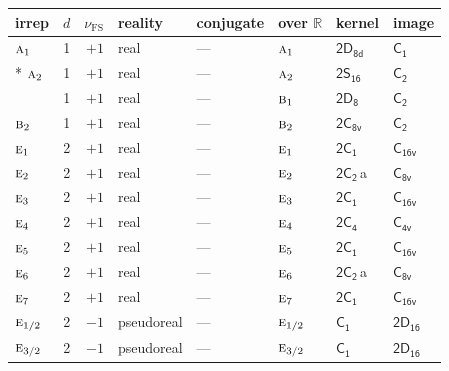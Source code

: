 \documentclass[10pt,a4paper]{article}
\makeatletter
\def\grouprule#1#2{\noalign{\marks\LTgroupmarks{\the\belowrulesep}\nobreak\vskip#1%
  \vskip\aboverulesep}\multispan\LT@cols\unskip{\leaders\hrule\@height#2\hfill\kern\z@}\cr
  \noalign{\penalty\LTrulebreak\vskip\belowrulesep\global\@lastruleclass\z@}}
\numberwithin{equation}{section}
\newcommand{\grp}[1]{\mathsf{#1}}
\newcommand{\irr}[1]{\text{\normalfont\scshape #1}}
\newcommand{\detbox}[1]{{\setlength{\fboxsep}{1pt}\fbox{#1}}}
\newcommand{\clsletter}[1]{\,{\scriptsize\color{black!55}#1}}
\newcommand{\fsind}{\nu_{\mathrm{FS}}}
\makeatother
\begin{document}
\setlength{\emergencystretch}{2em}\par\setlength{\emergencystretch}{0pt}
{\small\renewcommand{\arraystretch}{1.25}\setlength{\tabcolsep}{4pt}\begin{longtable}{@{}lrrlllll@{}}\toprule
irrep & $d$ & $\fsind$ & reality & conjugate & over $\mathbb{R}$ & kernel & image\\\midrule\endhead
\bottomrule\endfoot\endlastfoot
$\irr{a}_{1}$ & 1 & $+1$ & real & --- & $\irr{a}_{1}$ & \href{2D8d.pdf}{$\grp{2D_{8d}}$} & \href{../../../rotation/data/pdf/C1.pdf}{$\grp{C_{1}}$}\\*
$\irr{a}_{2}$ & 1 & $+1$ & real & --- & $\irr{a}_{2}$ & \href{2S16.pdf}{$\grp{2S_{16}}$} & \href{../../../rotation/data/pdf/C2.pdf}{$\grp{C_{2}}$}\\
\detbox{$\irr{b}_{1}$} & 1 & $+1$ & real & --- & $\irr{b}_{1}$ & \href{2D8.pdf}{$\grp{2D_{8}}$} & \href{../../../rotation/data/pdf/C2.pdf}{$\grp{C_{2}}$}\\
$\irr{b}_{2}$ & 1 & $+1$ & real & --- & $\irr{b}_{2}$ & \href{2C8v.pdf}{$\grp{2C_{8v}}$} & \href{../../../rotation/data/pdf/C2.pdf}{$\grp{C_{2}}$}\\
$\irr{e}_{1}$ & 2 & $+1$ & real & --- & $\irr{e}_{1}$ & \href{2C1.pdf}{$\grp{2C_{1}}$} & $\grp{C_{16v}}$\\
$\irr{e}_{2}$ & 2 & $+1$ & real & --- & $\irr{e}_{2}$ & \href{2C2.pdf}{$\grp{2C_{2}}$}\clsletter{a} & \href{../../../rotation/data/pdf/C8v.pdf}{$\grp{C_{8v}}$}\\
$\irr{e}_{3}$ & 2 & $+1$ & real & --- & $\irr{e}_{3}$ & \href{2C1.pdf}{$\grp{2C_{1}}$} & $\grp{C_{16v}}$\\
$\irr{e}_{4}$ & 2 & $+1$ & real & --- & $\irr{e}_{4}$ & \href{2C4.pdf}{$\grp{2C_{4}}$} & \href{../../../rotation/data/pdf/C4v.pdf}{$\grp{C_{4v}}$}\\
$\irr{e}_{5}$ & 2 & $+1$ & real & --- & $\irr{e}_{5}$ & \href{2C1.pdf}{$\grp{2C_{1}}$} & $\grp{C_{16v}}$\\
$\irr{e}_{6}$ & 2 & $+1$ & real & --- & $\irr{e}_{6}$ & \href{2C2.pdf}{$\grp{2C_{2}}$}\clsletter{a} & \href{../../../rotation/data/pdf/C8v.pdf}{$\grp{C_{8v}}$}\\
$\irr{e}_{7}$ & 2 & $+1$ & real & --- & $\irr{e}_{7}$ & \href{2C1.pdf}{$\grp{2C_{1}}$} & $\grp{C_{16v}}$\\
\grouprule{0pt}{\lightrulewidth}
$\irr{e}_{1/2}$ & 2 & $-1$ & pseudoreal & --- & $\irr{e}_{1/2}$ & \href{C1.pdf}{$\grp{C_{1}}$} & $\grp{2D_{16}}$\\
$\irr{e}_{3/2}$ & 2 & $-1$ & pseudoreal & --- & $\irr{e}_{3/2}$ & \href{C1.pdf}{$\grp{C_{1}}$} & $\grp{2D_{16}}$\\

\end{longtable}}
\end{document}
